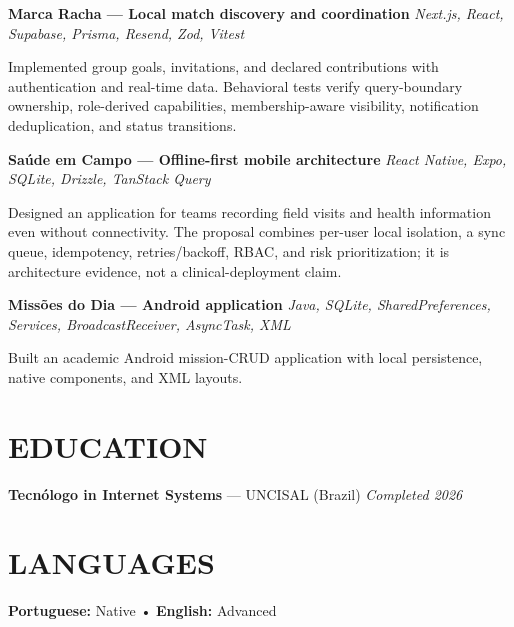 \documentclass[10pt,a4paper]{article}
\begin{document}
\vspace{0.5pt}

\noindent
\textbf{Marca Racha — Local match discovery and coordination}
\hfill
\textit{Next.js, React, Supabase, Prisma, Resend, Zod, Vitest}

\footnotesize

Implemented group goals, invitations, and declared contributions with authentication and real-time data. Behavioral tests verify query-boundary ownership, role-derived capabilities, membership-aware visibility, notification deduplication, and status transitions.

\vspace{0.5pt}

\noindent
\textbf{Saúde em Campo — Offline-first mobile architecture}
\hfill
\textit{React Native, Expo, SQLite, Drizzle, TanStack Query}

\footnotesize

Designed an application for teams recording field visits and health information even without connectivity. The proposal combines per-user local isolation, a sync queue, idempotency, retries/backoff, RBAC, and risk prioritization; it is architecture evidence, not a clinical-deployment claim.

\vspace{0.5pt}

\noindent
\textbf{Missões do Dia — Android application}
\hfill
\textit{Java, SQLite, SharedPreferences, Services, BroadcastReceiver, AsyncTask, XML}

\footnotesize

Built an academic Android mission-CRUD application with local persistence, native components, and XML layouts.


\section*{EDUCATION}

\noindent
\textbf{Tecnólogo in Internet Systems} — UNCISAL (Brazil)
\hfill
\textit{Completed 2026}


\section*{LANGUAGES}

\noindent
\textbf{Portuguese:} Native
\quad • \quad
\textbf{English:} Advanced
\end{document}
